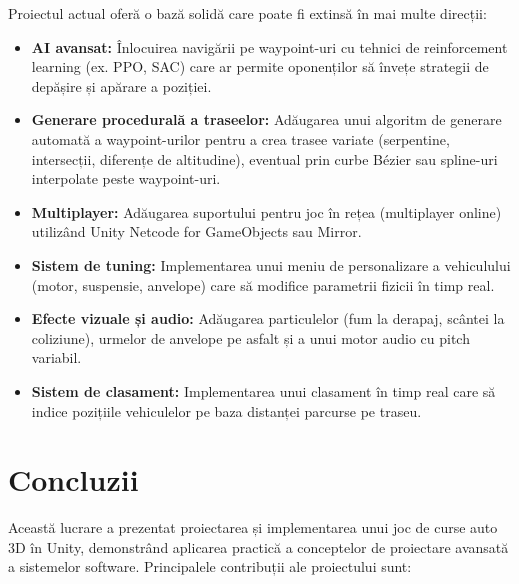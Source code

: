 \documentclass[11pt,twocolumn]{article}
\begin{document}
Proiectul actual oferă o bază solidă care poate fi extinsă în mai multe direcții:

\begin{itemize}
    \item \textbf{AI avansat:} Înlocuirea navigării pe waypoint-uri cu tehnici de reinforcement learning (ex. PPO, SAC) care ar permite oponenților să învețe strategii de depășire și apărare a poziției.

    \item \textbf{Generare procedurală a traseelor:} Adăugarea unui algoritm de generare automată a waypoint-urilor pentru a crea trasee variate (serpentine, intersecții, diferențe de altitudine), eventual prin curbe Bézier sau spline-uri interpolate peste waypoint-uri.

    \item \textbf{Multiplayer:} Adăugarea suportului pentru joc în rețea (multiplayer online) utilizând Unity Netcode for GameObjects sau Mirror.

    \item \textbf{Sistem de tuning:} Implementarea unui meniu de personalizare a vehiculului (motor, suspensie, anvelope) care să modifice parametrii fizicii în timp real.

    \item \textbf{Efecte vizuale și audio:} Adăugarea particulelor (fum la derapaj, scântei la coliziune), urmelor de anvelope pe asfalt și a unui motor audio cu pitch variabil.

    \item \textbf{Sistem de clasament:} Implementarea unui clasament în timp real care să indice pozițiile vehiculelor pe baza distanței parcurse pe traseu.
\end{itemize}

\section{Concluzii}
\label{sec:conclusion}

Această lucrare a prezentat proiectarea și implementarea unui joc de curse auto 3D în Unity, demonstrând aplicarea practică a conceptelor de proiectare avansată a sistemelor software. Principalele contribuții ale proiectului sunt:
\end{document}
